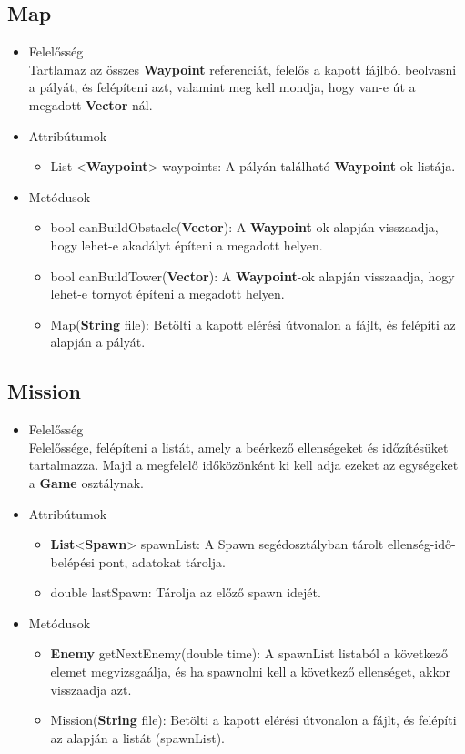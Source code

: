\subsection{Map}
\begin{itemize}
\item Felelősség\\
Tartlamaz az összes \textbf{Waypoint} referenciát, felelős a kapott fájlból beolvasni a pályát, és felépíteni azt, valamint meg kell mondja, hogy van-e út a megadott \textbf{Vector}-nál.
\item Attribútumok
	\begin{itemize}
		\item List <\textbf{Waypoint}> waypoints: A pályán található \textbf{Waypoint}-ok listája.
	\end{itemize}
\item Metódusok
	\begin{itemize}
		\item bool canBuildObstacle(\textbf{Vector}): A \textbf{Waypoint}-ok alapján visszaadja, hogy lehet-e akadályt építeni a megadott helyen.
		\item bool canBuildTower(\textbf{Vector}): A \textbf{Waypoint}-ok alapján visszaadja, hogy lehet-e tornyot építeni a megadott helyen.
		\item Map(\textbf{String} file): Betölti a kapott elérési útvonalon a fájlt, és felépíti az alapján a pályát.
	\end{itemize}
\end{itemize}


\subsection{Mission}
\begin{itemize}
\item Felelősség\\
Felelőssége, felépíteni a listát, amely a beérkező ellenségeket és időzítésüket tartalmazza. Majd a megfelelő időközönként ki kell adja ezeket az egységeket a \textbf{Game} osztálynak.
\item Attribútumok
	\begin{itemize}
		\item \textbf{List}<\textbf{Spawn}> spawnList: A Spawn segédosztályban tárolt ellenség-idő-belépési pont, adatokat tárolja.
		\item double lastSpawn: Tárolja az előző spawn idejét.
	\end{itemize}
\item Metódusok
	\begin{itemize}
		\item \textbf{Enemy} getNextEnemy(double time): A spawnList listaból a következő elemet megvizsgaálja, és ha spawnolni kell a következő ellenséget, akkor visszaadja azt.
		\item Mission(\textbf{String} file): Betölti a kapott elérési útvonalon a fájlt, és felépíti az alapján a listát (spawnList).
	\end{itemize}
\end{itemize}


